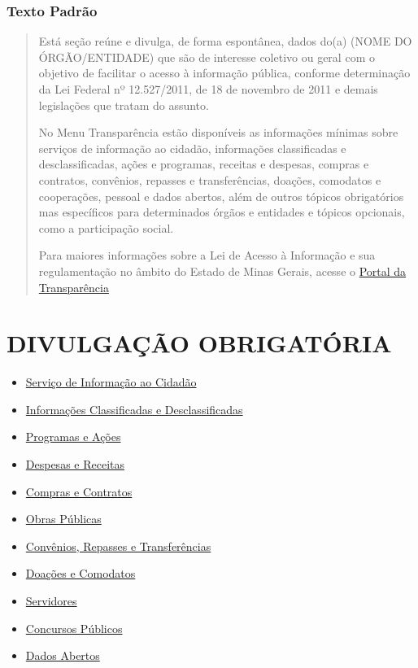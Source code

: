 \documentclass[]{book}
\providecommand{\tightlist}{%
  \setlength{\itemsep}{0pt}\setlength{\parskip}{0pt}}
\begin{document}
\hypertarget{texto-padruxe3o}{%
\subsection{Texto Padrão}\label{texto-padruxe3o}}

\begin{quote}
Está seção reúne e divulga, de forma espontânea, dados do(a) (NOME DO ÓRGÃO/ENTIDADE) que são de interesse coletivo ou geral com o objetivo de facilitar o acesso à informação pública, conforme determinação da Lei Federal nº 12.527/2011, de 18 de novembro de 2011 e demais legislações que tratam do assunto.

No Menu Transparência estão disponíveis as informações mínimas sobre serviços de informação ao cidadão, informações classificadas e desclassificadas, ações e programas, receitas e despesas, compras e contratos, convênios, repasses e transferências, doações, comodatos e cooperações, pessoal e dados abertos, além de outros tópicos obrigatórios mas específicos para determinados órgãos e entidades e tópicos opcionais, como a participação social.

Para maiores informações sobre a Lei de Acesso à Informação e sua regulamentação no âmbito do Estado de Minas Gerais, acesse o \href{http://www.transparencia.mg.gov.br}{Portal da Transparência}
\end{quote}

\hypertarget{divulgauxe7uxe3o-obrigatuxf3ria}{%
\chapter{DIVULGAÇÃO OBRIGATÓRIA}\label{divulgauxe7uxe3o-obrigatuxf3ria}}

\begin{itemize}
\tightlist
\item
  \href{servico-informacao.html}{Serviço de Informação ao Cidadão}
\item
  \href{informacoes-classificadas.html}{Informações Classificadas e Desclassificadas}
\item
  \href{programas-acoes.html}{Programas e Ações}
\item
  \href{despesas-receitas.html}{Despesas e Receitas}
\item
  \href{compras-contratos.html}{Compras e Contratos}
\item
  \href{obras-publicas.html}{Obras Públicas}
\item
  \href{convenios-repasses.html}{Convênios, Repasses e Transferências}
\item
  \href{doacoes.html}{Doações e Comodatos}
\item
  \href{servidores.html}{Servidores}
\item
  \href{concursos-publicos.html}{Concursos Públicos}
\item
  \href{dados-abertos.html}{Dados Abertos}
\end{itemize}
\end{document}
